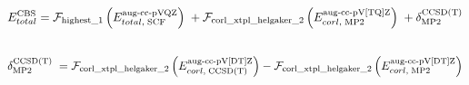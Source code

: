 \documentclass[letterpaper,10pt,english]{sphinxmanual}
\begin{document}
\begin{gather}
\begin{split}E_{total}^{\text{CBS}} = \mathcal{F}_{\text{highest\_1}} \left(E_{total,\; \text{SCF}}^{\text{aug-cc-pVQZ}}\right) \; + \mathcal{F}_{\text{corl\_xtpl\_helgaker\_2}} \left(E_{corl,\; \text{MP2}}^{\text{aug-cc-pV[TQ]Z}}\right) \; + \delta_{\text{MP2}}^{\text{CCSD(T)}}\end{split}\notag\\\begin{split}\end{split}\notag
\end{gather}\begin{gather}
\begin{split}\delta_{\text{MP2}}^{\text{CCSD(T)}} \; = \mathcal{F}_{\text{corl\_xtpl\_helgaker\_2}} \left(E_{corl,\; \text{CCSD(T)}}^{\text{aug-cc-pV[DT]Z}}\right) - \mathcal{F}_{\text{corl\_xtpl\_helgaker\_2}} \left(E_{corl,\; \text{MP2}}^{\text{aug-cc-pV[DT]Z}}\right)\end{split}\notag\\\begin{split}\end{split}\notag
\end{gather}
\end{document}
